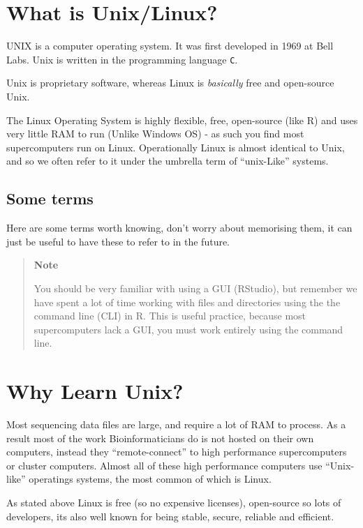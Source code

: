 \documentclass[
]{book}
\begin{document}
\hypertarget{what-is-unixlinux}{%
\section{What is Unix/Linux?}\label{what-is-unixlinux}}

UNIX is a computer operating system. It was first developed in 1969 at Bell Labs. Unix is written in the programming language \texttt{C}.

Unix is proprietary software, whereas Linux is \emph{basically} free and open-source Unix.

The Linux Operating System is highly flexible, free, open-source (like R) and uses very little RAM to run (Unlike Windows OS) - as such you find most supercomputers run on Linux. Operationally Linux is almost identical to Unix, and so we often refer to it under the umbrella term of ``unix-Like'' systems.

\hypertarget{some-terms}{%
\subsection{Some terms}\label{some-terms}}

Here are some terms worth knowing, don't worry about memorising them, it can just be useful to have these to refer to in the future.

\begin{quote}
\textbf{Note}

You should be very familiar with using a GUI (RStudio), but remember we have spent a lot of time working with files and directories using the the command line (CLI) in R. This is useful practice, because most supercomputers lack a GUI, you must work entirely using the command line.
\end{quote}

\hypertarget{why-learn-unix}{%
\section{Why Learn Unix?}\label{why-learn-unix}}

Most sequencing data files are large, and require a lot of RAM to process. As a result most of the work Bioinformaticians do is not hosted on their own computers, instead they ``remote-connect'' to high performance supercomputers or cluster computers. Almost all of these high performance computers use ``Unix-like'' operatings systems, the most common of which is Linux.

As stated above Linux is free (so no expensive licenses), open-source so lots of developers, its also well known for being stable, secure, reliable and efficient.
\end{document}
